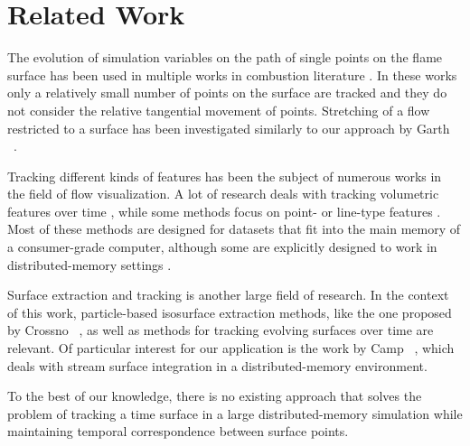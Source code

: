 %
\section{Related Work} %
\label{sec:fst_background_and_related_work}
%
The evolution of simulation variables on the path of single points on the flame
surface has been used in multiple works in combustion literature
\cite{Yeung1990,Sripakagorn2004,Scholtissek2017}.
%
In these works only a relatively small number of points on the surface are
tracked and they do not consider the relative tangential movement of points.
%
Stretching of a flow restricted to a surface has been investigated similarly to
our approach by Garth \etal{}~\cite{Garth2008}.
%

%
Tracking different kinds of features has been the subject of numerous works in
the field of flow visualization.
%
A lot of research deals with tracking volumetric features over time
\cite{Silver1997,Sauer2014,Clyne2013,Mascarenhas2009,Duque2012,Muelder2009},
while some methods focus on point- \cite{Garth2004,Theisel2003a} or line-type
features \cite{Bremer2010}.
%
Most of these methods are designed for datasets that fit into the main memory of
a consumer-grade computer, although some are explicitly designed to work in
distributed-memory settings \cite{Wang2013}.
%

%
Surface extraction and tracking is another large field of research.
%
In the context of this work, particle-based isosurface extraction methods, like
the one proposed by Crossno \etal{}~\cite{Crossno1997}, as well as methods for
tracking evolving surfaces over time \cite{Krishnan2009,Buerger2009,Berres2015}
are relevant.
%
Of particular interest for our application is the work by Camp
\etal{}~\cite{Camp2012}, which deals with stream surface integration in a
distributed-memory environment.
%

%
To the best of our knowledge, there is no existing approach that solves the
problem of tracking a time surface in a large distributed-memory simulation
while maintaining temporal correspondence between surface points.
%
